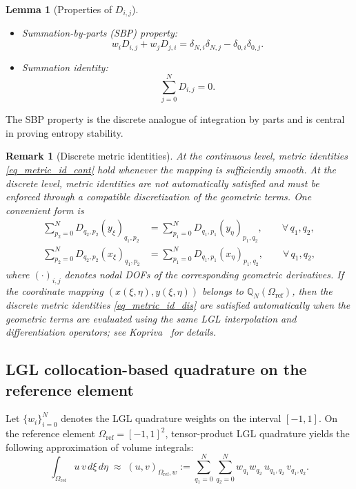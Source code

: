 \documentclass[fleqn,11pt]{amsart}
\newtheorem{lemma}[theorem]{Lemma}
\newtheorem{remark}{Remark}[section]
\begin{document}
\begin{lemma}[Properties of $D_{i,j}$]
\label{lemma_D}
\begin{itemize}
\item {Summation-by-parts (SBP) property:}
\begin{equation}
w_iD_{i,j}+w_jD_{j,i}=\delta_{N,i}\delta_{N,j}-\delta_{0,i}\delta_{0,j}.
\label{eq_sbp_1}
\end{equation}
\item {Summation identity:}
\begin{equation}
\label{sum-1}
\sum_{j=0}^N D_{i,j}=0.
\end{equation}
\end{itemize}
\end{lemma}

The SBP property is the discrete analogue of integration by parts and is central in proving entropy stability.


\begin{remark}[Discrete metric identities]
\label{rem:discrete_metric}
At the continuous level, metric identities \eqref{eq_metric_id_cont} hold whenever the mapping is sufficiently smooth.
At the discrete level, metric identities are not automatically satisfied and must be enforced through a compatible
discretization of the geometric terms. One convenient form is
\begin{equation}
\begin{aligned}
\sum_{p_2=0}^N D_{q_2,p_2}(y_{\xi})_{q_1,p_2}
&=\sum_{p_1=0}^N D_{q_1,p_1}(y_{\eta})_{p_1,q_2}, \qquad \forall\, q_1,q_2,\\
\sum_{p_2=0}^N D_{q_2,p_2}(x_{\xi})_{q_1,p_2}
&=\sum_{p_1=0}^N D_{q_1,p_1}(x_{\eta})_{p_1,q_2}, \qquad \forall\, q_1,q_2,
\end{aligned}
\label{eq_metric_id_dis}
\end{equation}
where $(\cdot)_{i,j}$ denotes nodal DOFs of the corresponding geometric derivatives. If the coordinate mapping $(x(\xi,\eta),y(\xi,\eta))$ belongs to
$\mathbb Q_N(\Omega_{\mathrm{ref}})$, then the discrete metric identities \eqref{eq_metric_id_dis} are satisfied
automatically when the geometric terms are evaluated using the same LGL interpolation and differentiation
operators; see Kopriva~\cite{Kopriva2006} for details.
\end{remark}

\subsection{LGL collocation-based quadrature on the reference element}
\label{sec:collocation}
Let  $\{w_i\}_{i=0}^N$ denotes the LGL quadrature weights on the interval $[-1,1]$. On the reference element $\Omega_{\mathrm{ref}} = [-1,1]^2$, tensor-product LGL quadrature yields
the following approximation of volume integrals:
\begin{equation}
\int_{\Omega_{\mathrm{ref}}} u\, v \, d\xi \, d\eta
\;\approx\;
(u,v)_{\Omega_{\mathrm{ref}},w}
:=
\sum_{q_1=0}^{N}\sum_{q_2=0}^{N}
w_{q_1} w_{q_2}\,
u_{q_1,q_2} \, v_{q_1,q_2}.
\label{eq_quad_rule}
\end{equation}
\end{document}

